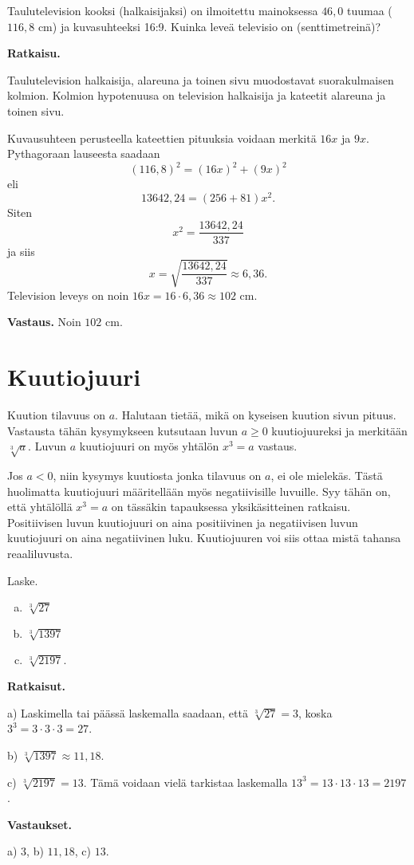 \begin{esimerkki}
Taulutelevision kooksi (halkaisijaksi) on ilmoitettu mainoksessa $46,0$ tuumaa ($116,8$ cm) ja kuvasuhteeksi 16:9. Kuinka leveä televisio on (senttimetreinä)?

{\bf Ratkaisu.}

Taulutelevision halkaisija, alareuna ja toinen sivu muodostavat suorakulmaisen kolmion. Kolmion hypotenuusa on television halkaisija ja kateetit alareuna ja toinen sivu.

Kuvausuhteen perusteella kateettien pituuksia voidaan merkitä $16x$ ja $9x$. Pythagoraan lauseesta saadaan
\[
(116,8)^2 = (16x)^2 + (9x)^2
\]
eli
\[
13642,24 = (256+81)x^2.
\]
Siten
\[
x^2 = \frac{13642,24}{337}
\]
ja siis
\[
x= \sqrt{\frac{13642,24}{337}} \approx 6,36.
\]
Television leveys on noin $16x = 16\cdot 6,36\approx 102$ cm.

{\bf Vastaus.} Noin $102$ cm.
\end{esimerkki}



\section{Kuutiojuuri}

Kuution tilavuus on $a$. Halutaan tietää, mikä on kyseisen kuution sivun pituus. Vastausta tähän kysymykseen kutsutaan luvun $a\ge 0$ kuutiojuureksi ja merkitään $\sqrt[3]{a}$. Luvun $a$ kuutiojuuri on myös yhtälön $x^3 = a$ vastaus.


Jos $a<0$, niin kysymys kuutiosta jonka tilavuus on $a$, ei ole mielekäs. Tästä huolimatta kuutiojuuri määritellään myös negatiivisille luvuille. Syy tähän on, että yhtälöllä $x^3=a$ on tässäkin tapauksessa yksikäsitteinen ratkaisu. Positiivisen luvun kuutiojuuri on aina positiivinen ja negatiivisen luvun kuutiojuuri on aina negatiivinen luku. Kuutiojuuren voi siis ottaa mistä tahansa reaaliluvusta.


\begin{esimerkki}
Laske.
\begin{enumerate}[a)]
\item $\sqrt[3]{27}$

\item $\sqrt[3]{1397}$

\item $\sqrt[3]{2197}$.
\end{enumerate}

{\bf Ratkaisut.}

a)
Laskimella tai päässä laskemalla saadaan, että $\sqrt[3]{27} = 3$, koska  $3^3 =3\cdot 3\cdot 3=27$.

b) 
$\sqrt[3]{1397}\approx 11,18$. 

c)
$\sqrt[3]{2197}=13$.
Tämä voidaan vielä tarkistaa laskemalla $13^3 = 13\cdot 13\cdot 13=2197$.

{\bf Vastaukset.}

a) $3$, b) $11,18$, c) $13$.
\end{esimerkki}


